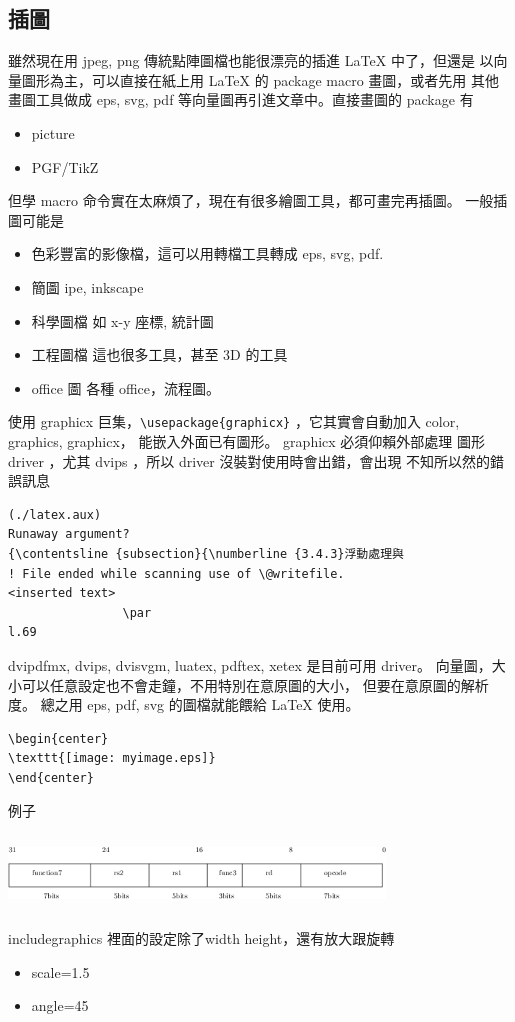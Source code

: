 \subsection{插圖}
雖然現在用 jpeg, png 傳統點陣圖檔也能很漂亮的插進 {\LaTeX} 中了，但還是
以向量圖形為主，可以直接在紙上用 {\LaTeX} 的 package macro 畫圖，或者先用
其他畫圖工具做成 eps, svg, pdf 等向量圖再引進文章中。直接畫圖的 package
有
\begin{itemize}
\item picture
\item PGF/TikZ
\end{itemize}
但學 macro 命令實在太麻煩了，現在有很多繪圖工具，都可畫完再插圖。
一般插圖可能是
\begin{itemize}
\item 色彩豐富的影像檔，這可以用轉檔工具轉成 eps, svg, pdf.
\item 簡圖 ipe, inkscape
\item 科學圖檔 如 x-y 座標, 統計圖
\item 工程圖檔 這也很多工具，甚至 3D 的工具
\item office 圖 各種 office，流程圖。
\end{itemize}
使用 graphicx 巨集，\verb=\usepackage{graphicx}= ，它其實會自動加入
color, graphics, graphicx， 能嵌入外面已有圖形。 graphicx 必須仰賴外部處理
圖形 driver ，尤其 dvips ，所以 driver 沒裝對使用時會出錯，會出現
不知所以然的錯誤訊息
\begin{verbatim}
(./latex.aux)
Runaway argument?
{\contentsline {subsection}{\numberline {3.4.3}浮動處理與
! File ended while scanning use of \@writefile.
<inserted text>
                \par
l.69 
\end{verbatim}
dvipdfmx, dvips, dvisvgm, luatex, pdftex, xetex 是目前可用 driver。
向量圖，大小可以任意設定也不會走鐘，不用特別在意原圖的大小，
但要在意原圖的解析度。 總之用 eps, pdf, svg 的圖檔就能餵給 {\LaTeX} 使用。
\begin{verbatim}
\begin{center}
\texttt{[image: myimage.eps]}
\end{center}
\end{verbatim}
例子
\begin{center}
\includegraphics[width=10cm,height=2cm,keepaspectratio]{images/riscv}
\end{center}
includegraphics 裡面的設定除了width height，還有放大跟旋轉
\begin{itemize}
\item scale=1.5
\item angle=45
\end{itemize}

